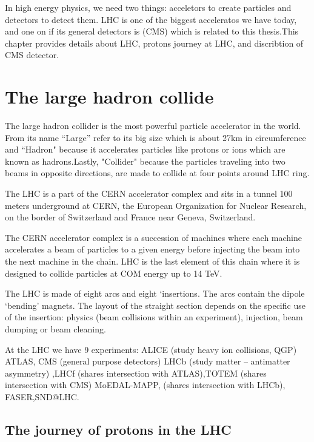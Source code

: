 

In high	energy physics, we need two things: acceletors to create particles and detectors to detect them. LHC is one of the biggest acceleratos we have today, and one on if its general detectors is (CMS) which is related to this thesis.This chapter provides details about LHC, protons journey at LHC, and discribtion of CMS detector.   

\section{The large hadron collide}

The large hadron collider is the most powerful particle accelerator in the world. From its name “Large” refer to its big size which is about 27km in circumference and “Hadron" because it accelerates particles like protons or ions which are known as hadrons.Lastly, "Collider" because the particles traveling into two beams in opposite directions, are made to collide at four points around LHC ring.

The LHC is a part of the CERN accelerator complex and sits in a tunnel 100 meters underground at CERN, the European Organization for Nuclear Research, on the border of Switzerland and France near Geneva, Switzerland.

The CERN accelerator complex is a succession of machines where each machine accelerates a beam of particles to a given energy before injecting the beam into the next machine in the chain. LHC is the last element of this chain where it is designed to collide particles at COM energy up to 14 TeV.

The LHC is made of eight arcs and eight ‘insertions. The arcs contain the dipole ‘bending’ magnets. The layout of the straight section depends on the specific use of the insertion: physics (beam collisions within an experiment), injection, beam dumping or beam cleaning.

At the LHC we have 9 experiments:
ALICE (study heavy ion collisions, QGP) ATLAS, CMS  (general purpose detectors) LHCb (study matter – antimatter asymmetry) ,LHCf (shares intersection with ATLAS),TOTEM (shares intersection with CMS) MoEDAL-MAPP, (shares intersection with LHCb), FASER,SND@LHC.

\subsection{The journey of protons in the LHC}

